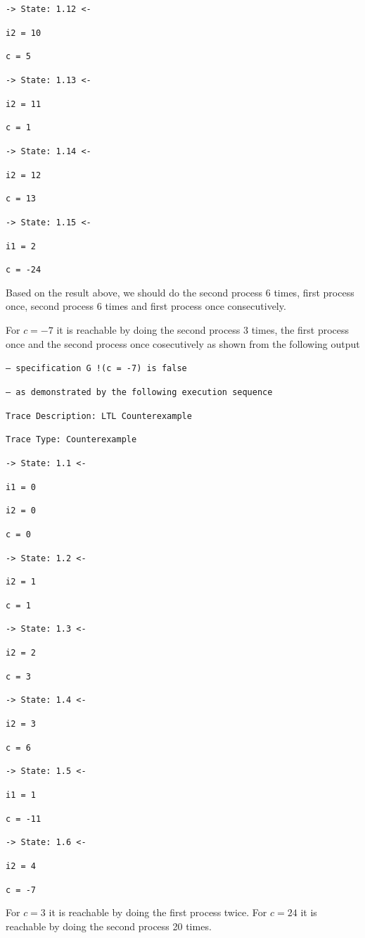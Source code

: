 \documentclass[12pt]{article}
\begin{document}
{	{\tt   -> State: 1.12 <- }
	
	{\tt     i2 = 10 }
	
	{\tt     c = 5 }
	
	{\tt   -> State: 1.13 <- }
	
	{\tt     i2 = 11 }
	
	{\tt     c = 1 }
	
	{\tt   -> State: 1.14 <- }
	
	{\tt     i2 = 12 }
	
	{\tt     c = 13 }
	
	{\tt   -> State: 1.15 <- }
	
	{\tt     i1 = 2 }
	
	{\tt     c = -24 }
	
}

Based on the result above, we should do the second process 6 times, first process once, second process 6 times and first process once consecutively.

For $c=-7$ it is reachable by doing the second process 3 times, the first process once and the second process once cosecutively as shown from the following output
{\footnotesize

{\tt -- specification  G !(c = -7)  is false }

{\tt -- as demonstrated by the following execution sequence }

{\tt Trace Description: LTL Counterexample  }

{\tt Trace Type: Counterexample  }

{\tt   -> State: 1.1 <- }

{\tt     i1 = 0 }

{\tt     i2 = 0 }

{\tt     c = 0 }

{\tt   -> State: 1.2 <- }

{\tt     i2 = 1 }

{\tt     c = 1 }

{\tt   -> State: 1.3 <- }

{\tt     i2 = 2 }

{\tt     c = 3 }

{\tt   -> State: 1.4 <- }

{\tt     i2 = 3 }

{\tt     c = 6 }

{\tt   -> State: 1.5 <- }

{\tt     i1 = 1 }

{\tt     c = -11 }

{\tt   -> State: 1.6 <- }

{\tt     i2 = 4 }

{\tt     c = -7 }
}

For $c=3$ it is reachable by doing the first process twice. For $c=24$ it is reachable by doing the second process 20 times.
\end{document}
